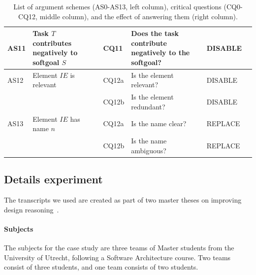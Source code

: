 \begin{table}[h]
\begin{tabularx}{\textwidth}{|l|l|l|X|l|l|}
AS11 & Task $T$ contributes negatively to softgoal $S$& CQ11 & Does the task contribute negatively to the softgoal?& DISABLE\\
\hline
\hline
AS12 & Element $IE$ is relevant & CQ12a & Is the element relevant? & DISABLE\\
&  & CQ12b & Is the element redundant? & DISABLE\\
\hline
AS13 & Element $IE$ has name $n$ & CQ12a & Is the name clear? & REPLACE\\
&  & CQ12b & Is the name ambiguous? & REPLACE\\
\hline
\end{tabularx}
\caption{List of argument schemes (AS0-AS13, left column), critical questions (CQ0-CQ12, middle column), and the effect of answering them (right column).}
\label{table:argument-schemes}
\end{table}

\subsection{Details experiment}

The transcripts we used are created as part of two master theses on improving design reasoning~\cite{masterthesis1,masterthesis2}.

\paragraph{Subjects} The subjects for the case study are three teams of Master students from the University of Utrecht, following a Software Architecture course. Two teams consist of three students, and one team consists of two students.

